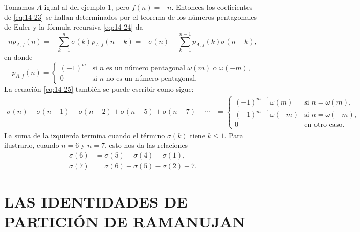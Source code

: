     \begin{ejemplo}
        Tomamos $A$ igual al del ejemplo 1, pero $f(n)=-n$. Entonces los coeficientes de
        \eqref{eq:14-23} se hallan determinados por el teorema de los números pentagonales de
        Euler y la fórmula recursiva \eqref{eq:14-24} da
        \begin{equation}\label{eq:14-25}
            np_{A,f}(n)=-\sum_{k=1}^{n}\sigma(k)p_{A,f}(n-k)=-\sigma(n)-\sum_{k=1}^{n-1}p_{A,f}(k)\sigma(n-k),
        \end{equation}
        en donde
        \begin{equation*}
            p_{A,f}(n)=
            \begin{cases}
                (-1)^m&\text{si }n\text{ es un número pentagonal }\omega(m)\text{ o }\omega(-m),\\
                0&\text{si }n\text{ no es un número pentagonal.}
            \end{cases}
        \end{equation*}
        La ecuación \eqref{eq:14-25} también se puede escribir como sigue:
        \begin{align*}
            \sigma(n)-\sigma(n-1)-\sigma(n-2)+\sigma(n-5)+\sigma(n-7)-\cdots
            &=
            \begin{cases}
                (-1)^{m-1}\omega(m)&\text{si }n=\omega(m),\\
                (-1)^{m-1}\omega(-m)&\text{si }n=\omega(-m),\\
                0&\text{en otro caso.}
            \end{cases}
        \end{align*}
        La suma de la izquierda termina cuando el término $\sigma(k)$ tiene $k\leq1$. Para
        ilustrarlo, cuando $n=6$ y $n=7$, esto nos da las relaciones
        \begin{align*}
            \sigma(6)&=\sigma(5)+\sigma(4)-\sigma(1),\\
            \sigma(7)&=\sigma(6)+\sigma(5)-\sigma(2)-7.
        \end{align*}
    \end{ejemplo}

    \section{LAS IDENTIDADES DE PARTICIÓN DE RAMANUJAN}

